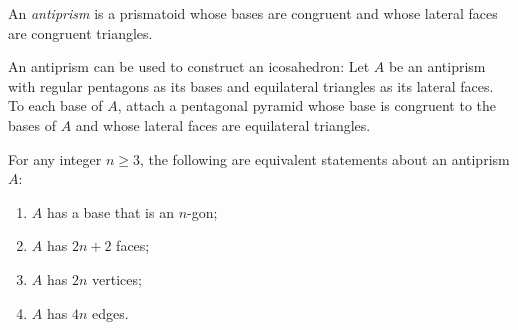 \documentclass[12pt]{article}
\begin{document}

An \emph{antiprism} is a prismatoid whose bases are congruent and whose lateral faces are congruent triangles.

An antiprism can be used to construct an icosahedron:  Let $A$ be an antiprism with regular pentagons as its bases and equilateral triangles as its lateral faces.  To each base of $A$, attach a  pentagonal pyramid whose base is congruent to the bases of $A$ and whose lateral faces are equilateral triangles.

For any integer $n \ge 3$, the following are equivalent statements about an antiprism $A$:

\begin{enumerate}
\item $A$ has a base that is an $n$-gon;
\item $A$ has $2n+2$ faces;
\item $A$ has $2n$ vertices;
\item $A$ has $4n$ edges.
\end{enumerate}
\end{document}
